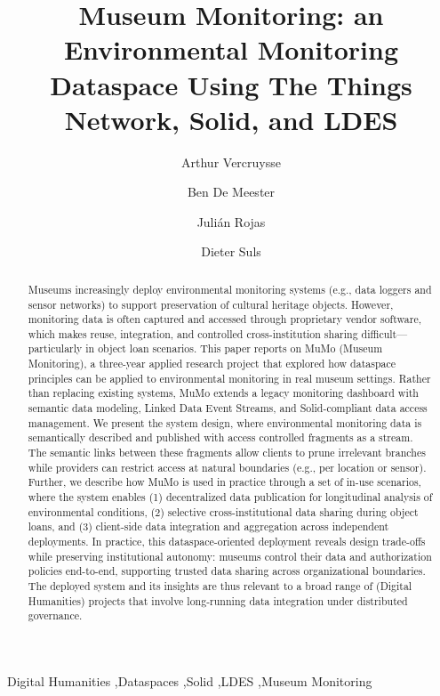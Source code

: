 \documentclass{ceurart}
\author[1]{Arthur Vercruysse}[%
orcid=0000-0002-0877-7063,%
email=arthur.vercruysse@ugent.be,%
%
]
\author[1]{Ben De Meester}[%
orcid=0000-0001-7116-9338,%
email=ben.demeester@ugent.be,%
%
]
\author[1]{Julián Rojas}[%
orcid=0000-0002-9421-8566,%
email=JulianAndres.RojasMelendez@UGent.be,%
%
]
\author[2]{Dieter Suls}[%
%
email=dieter.suls@momu.be,%
%
]
\begin{document}


\title{Museum Monitoring: an Environmental Monitoring Dataspace Using
The Things Network, Solid, and LDES}

\begin{abstract}
Museums increasingly deploy environmental monitoring systems (e.g., data
loggers and sensor networks) to support preservation of cultural
heritage objects. However, monitoring data is often captured and
accessed through proprietary vendor software, which makes reuse,
integration, and controlled cross-institution sharing
difficult---particularly in object loan scenarios. This paper reports on
MuMo (Museum Monitoring), a three-year applied research project that
explored how dataspace principles can be applied to environmental
monitoring in real museum settings. Rather than replacing existing
systems, MuMo extends a legacy monitoring dashboard with semantic data
modeling, Linked Data Event Streams, and Solid-compliant data access
management. We present the system design, where environmental monitoring
data is semantically described and published with access controlled
fragments as a stream. The semantic links between these fragments allow
clients to prune irrelevant branches while providers can restrict access
at natural boundaries (e.g., per location or sensor). Further, we
describe how MuMo is used in practice through a set of in-use scenarios,
where the system enables (1) decentralized data publication for
longitudinal analysis of environmental conditions, (2) selective
cross-institutional data sharing during object loans, and (3)
client-side data integration and aggregation across independent
deployments. In practice, this dataspace-oriented deployment reveals
design trade-offs while preserving institutional autonomy: museums
control their data and authorization policies end-to-end, supporting
trusted data sharing across organizational boundaries. The deployed
system and its insights are thus relevant to a broad range of (Digital
Humanities) projects that involve long-running data integration under
distributed governance.
\end{abstract}
\begin{keywords}
Digital Humanities \sep Dataspaces \sep Solid \sep LDES \sep Museum
Monitoring
\end{keywords}
\end{document}
